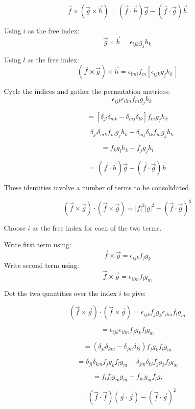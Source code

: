 \begin{question}
$$\vec{f} \times \left( \vec{g} \times\vec{h} \right) = \left( \vec{f} \cdot \vec{h} \right) \vec{g} - \left( \vec{f} \cdot\vec{g} \right) \vec{h}$$
\end{question}
\begin{solution}[print]

Using $i$ as the free index:
$$ \vec{g} \times \vec{h} = \epsilon_{ijk} g_j h_k $$

Using $l$ as the free index:
$$ \left( \vec{f} \times \vec{g} \right) \times \vec{h} = \epsilon_{lmi} f_m \left[ \epsilon_{ijk} g_j h_k \right] $$

Cycle the indices and gather the permutation matrices:
$$ = \epsilon_{ijk} \epsilon_{ilm} f_m g_j h_k $$

$$ = \left[ \delta_{jl} \delta_{mk}  - \delta_{mj} \delta_{lk} \right] f_m g_j h_k $$

$$ = \delta_{jl} \delta_{mk}  f_m g_j h_k - \delta_{mj} \delta_{lk} f_m g_j h_k $$

$$ = f_k g_l h_k - f_j g_j h_l $$

$$ = \left( \vec{f} \cdot \vec{h} \right) \vec{g} - \left( \vec{f} \cdot \vec{g} \right) \vec{h} $$

\end{solution}


These identities involve a number of terms to be consolidated.


\begin{question}
$$(\vec{f} \times \vec{g}) \cdot (\vec{f} \times \vec{g}) = |f|^2 |g|^2 - (\vec{f} \cdot \vec{g})^2$$
\end{question}
\begin{solution}[print]

Choose $i$ as the free index for each of the two terms.

Write first term using:
$$ \vec{f} \times \vec{g} = \epsilon_{ijk} f_j g_k $$
Write second term using:
$$ \vec{f} \times \vec{g} = \epsilon_{ilm} f_l g_m $$

Dot the two quantities over the index $i$ to give:

$$ \left( \vec{f} \times \vec{g} \right) \cdot \left( \vec{f} \times \vec{g} \right) = \epsilon_{ijk} f_j g_k \epsilon_{ilm} f_l g_m $$

$$ = \epsilon_{ijk} \epsilon_{ilm} f_j g_k f_l g_m $$

$$ = \left( \delta_{jl} \delta_{km} - \delta_{jm} \delta_{kl} \right) f_j g_k f_l g_m $$

$$ = \delta_{jl} \delta_{km} f_j g_k f_l g_m - \delta_{jm} \delta_{kl} f_j g_k f_l g_m $$

$$ = f_l f_l g_m g_m - f_m g_m f_l g_l $$

$$ = \left( \vec{f} \cdot \vec{f} \right) \left( \vec{g} \cdot \vec{g} \right) - \left( \vec{f} \cdot \vec{g} \right)^2 $$

\end{solution}


